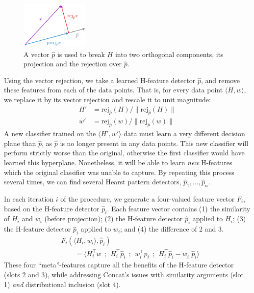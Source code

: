\documentclass[12pt]{article}
\begin{document}
\begin{figure}
  \begin{center}
  \includegraphics[width=0.30\textwidth]{figures/vecproj}
\end{center}
\caption{A vector $\hat p$ is used to break $H$ into two orthogonal components,
its projection and the rejection over $\hat p$.}
\label{fig:vecproj}
\end{figure}

Using the vector rejection, we take a learned H-feature detector $\hat p$,
and remove these features from each of the data points. That is, for every data
point $\langle H, w\rangle$, we replace it by its vector rejection and rescale
it to unit magnitude:
\begin{align*}
  H' & = \text{rej}_{\hat p}(H) / \|\text{rej}_{\hat p}(H)\|\\
  w' & = \text{rej}_{\hat p}(w) / \|\text{rej}_{\hat p}(w)\|
\end{align*}
A new classifier trained on the $\langle H', w'\rangle$ data must learn
a very different decision plane than $\hat p$, as $\hat p$ is no longer present
in any data points. This new classifier will perform strictly worse than the
original, otherwise the first classifier would have learned this hyperplane.
Nonetheless, it will be able to learn {\em new} H-features which the
original classifier was unable to capture. By repeating this process several
times, we can find several Hearst pattern detectors, $\hat p_1, \ldots, \hat
p_n$.

In each iteration $i$ of the procedure, we generate a four-valued feature vector
$F_i$, based on the H-feature detector $\hat p_i$. Each
feature vector contains (1) the similarity of $H_i$ and $w_i$ (before projection);
(2) the H-feature detector
$\hat p_i$ applied to $H_i$; (3) the H-feature detector $\hat p_i$ applied to $w_i$; and
(4) the difference of 2 and 3.
\begin{align*}
  & F_i(\langle H_i, w_i\rangle, \hat p_i)\\
  & \qquad = \langle H_i^{\top}w~~;~~H_i^\top\hat p_i~~;~~w_i^\top\hat p_i~~;~~H_i^\top\hat p_i - w_i^\top\hat p_i\rangle
\end{align*}
These four ``meta''-features capture all the benefits of the H-feature
detector (slots 2 and 3), while addressing Concat's issues with
similarity arguments (slot 1) {\em and} distributional inclusion (slot 4).
\end{document}
